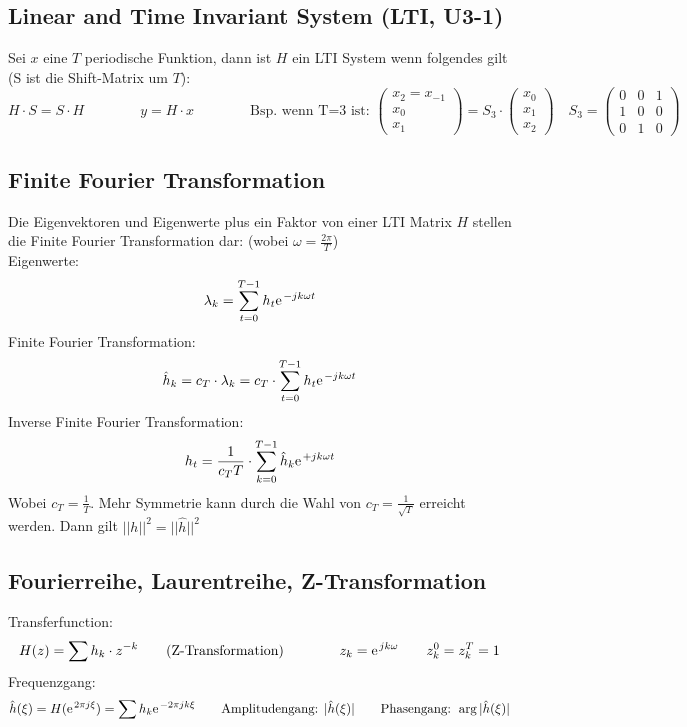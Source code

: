 \subsection{Linear and Time Invariant System (LTI, U3-1)}
Sei $x$ eine $T$ periodische Funktion, dann ist $H$ ein LTI System wenn folgendes gilt (S ist die Shift-Matrix um $T$):
\[ 	H\cdot S = S\cdot H \qquad \qquad y=H\cdot x 
	\qquad \qquad 
	\text{Bsp. wenn T=3 ist: } \left( \begin{array}{ccc} x_2=x_{-1} \\ x_0 \\ x_1 \end{array} \right) = S_3 \cdot \left( \begin{array}{ccc} x_0 \\ x_1 \\ x_2 \end{array} \right) \quad
	S_3=
	\left( \begin{array}{ccc}
	0 & 0 & 1 \\
	1 & 0 & 0 \\
	0 & 1 & 0 
	\end{array} \right) 
\]


\subsection{Finite Fourier Transformation}
Die Eigenvektoren und Eigenwerte plus ein Faktor von einer LTI Matrix $H$ stellen die Finite Fourier Transformation dar: (wobei $\omega = \frac{2\pi}{T}$)\\

Eigenwerte: \[ \lambda_k = \sum_{t=0}^{T-1} h_t \e^{-jk\omega t} \]
Finite Fourier Transformation: \[ \hat{h}_k = c_T \cdot \lambda_k = c_T \cdot \sum_{t=0}^{T-1} h_t \e^{-jk\omega t} \]
Inverse Finite Fourier Transformation: \[ h_t = \frac{1}{c_T T} \cdot \sum_{k=0}^{T-1}\hat{h}_k \e^{+jk\omega t} \]
Wobei $c_T = \frac{1}{T}$. Mehr Symmetrie kann durch die Wahl von $c_T = \frac{1}{\sqrt{T}}$ erreicht werden. Dann gilt $||h||^2=||\hat{h}||^2$


\subsection{Fourierreihe, Laurentreihe, Z-Transformation}

Transferfunction: \[ H(z)=\sum h_k \cdot z^{-k} \qquad \text{(Z-Transformation)} \qquad \qquad z_k=\e^{jk\omega} \qquad z_k^0=z_k^T=1 \]
Frequenzgang: \[ \hat{h}(\xi) = H(\e^{2\pi j \xi})=\sum h_k \e^{-2\pi jk \xi} \qquad \text{Amplitudengang: } |\hat{h}(\xi)| \qquad \text{Phasengang: } \arg|\hat{h}(\xi)| \]


